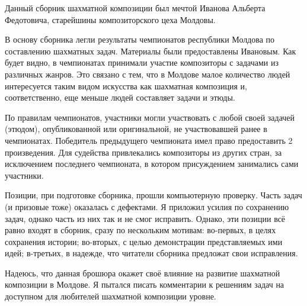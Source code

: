 Данный сборник шахматной композиции был мечтой Иванова Альберта Федотовича, старейшины композиторского цеха Молдовы.

В основу сборника легли результаты чемпионатов республики Молдова по составлению шахматных задач. Материалы были предоставлены  Ивановым. Как будет видно, в чемпионатах принимали участие композиторы с задачами из различных жанров. Это связано с тем, что в Молдове малое количество людей интересуется таким видом искусства как шахматная композиция и, соответственно, еще меньше людей составляет задачи и этюды.

По правилам чемпионатов, участники могли участвовать с любой своей задачей (этюдом), опубликованной или оригинальной, не участвовавшей ранее в чемпионатах. Победитель предыдущего чемпионата имел право предоставить 2 произведения. Для судейства привлекались композиторы из других стран, за исключением последнего чемпионата, в котором присуждением занимались сами участники.

Позиции, при подготовке сборника, прошли компьютерную проверку. Часть задач (и призовые тоже) оказалась с дефектами. Я приложил усилия по сохранению задач, однако часть из них так и не смог исправить. Однако, эти позиции всё равно входят в сборник, сразу по нескольким мотивам: во-первых, в целях сохранения истории; во-вторых, с целью демонстрации представляемых ими идей; в-третьих, в надежде, что читатели сборника предложат свои исправления.

Надеюсь, что данная брошюра окажет своё влияние на развитие шахматной композиции в Молдове. Я пытался писать комментарии к решениям задач на доступном для любителей шахматной композиции уровне. 
